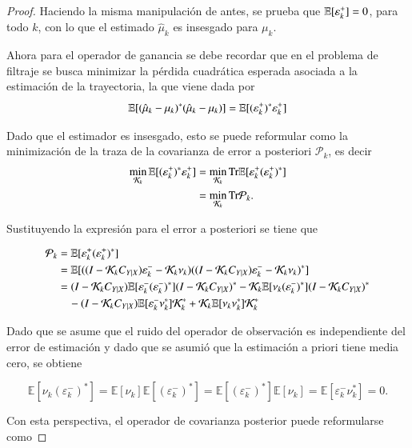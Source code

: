 \begin{proof}
Haciendo la misma manipulación de antes, se prueba que $\mathbb{E}[\varepsilon^+_k] = 0$, para todo $k$, con lo que el estimado $\hat{\mu}_k$ es insesgado para $\mu_k$.

Ahora para el operador de ganancia se debe recordar que en el problema de filtraje se busca minimizar la pérdida cuadrática esperada asociada a la estimación de la trayectoria, la que viene dada por
\begin{equation*}
    \mathbb{E}[(\hat{\mu}_{k} - \mu_{k})^* (\hat{\mu}_{k} - \mu_{k}) ] = \mathbb{E} [ (\varepsilon_k^+)^* \varepsilon_k^+ ]
\end{equation*}

Dado que el estimador es insesgado, esto se puede reformular como la minimización de la traza de la covarianza de error a posteriori $\mathcal{P}_k$, es decir
\begin{align*}
\min_{\mathcal{K}_k} \mathbb{E}[(\varepsilon_k^+)^* \varepsilon_k^+] &= \min_{\mathcal{K}_k} \text{Tr} \mathbb{E}[\varepsilon_k^+(\varepsilon_k^+)^*] \\
&= \min_{\mathcal{K}_k} \text{Tr} \mathcal{P}_{k}.
\end{align*}

Sustituyendo la expresión para el error a posteriori se tiene que

\begin{align*}
\mathcal{P}_k &= \mathbb{E}[\varepsilon^+_k(\varepsilon^+_k)^*] \\
&= \mathbb{E}[((I - \mathcal{K}_k C_{Y|X})\varepsilon^-_k - \mathcal{K}_k \nu_k)((I - \mathcal{K}_k C_{Y|X})\varepsilon^-_k - \mathcal{K}_k \nu_k)^*] \\
&= (I - \mathcal{K}_k C_{Y|X})\mathbb{E}[\varepsilon^-_k(\varepsilon^-_k)^*](I - \mathcal{K}_k C_{Y|X})^* 
- \mathcal{K}_k\mathbb{E}[\nu_k(\varepsilon^-_k)^*](I - \mathcal{K}_k C_{Y|X})^* \\
&\quad - (I - \mathcal{K}_k C_{Y|X})\mathbb{E}[\varepsilon^-_k\nu_k^*]\mathcal{K}_k^* + \mathcal{K}_k\mathbb{E}[\nu_k\nu_k^*]\mathcal{K}_k^*
\end{align*}

Dado que se asume que el ruido del operador de observación es independiente del error de estimación y dado que se asumió que la estimación a priori tiene media cero, se obtiene

\begin{equation*}
\mathbb{E}[\nu_k(\varepsilon^-_k)^*] = \mathbb{E}[\nu_k]\mathbb{E}[(\varepsilon^-_k)^*] = \mathbb{E}[(\varepsilon^-_k)^*]\mathbb{E}[\nu_k] = \mathbb{E}[\varepsilon^-_k\nu_k^*] = 0.
\end{equation*}

Con esta perspectiva, el operador de covarianza posterior puede reformularse como


\end{proof}
